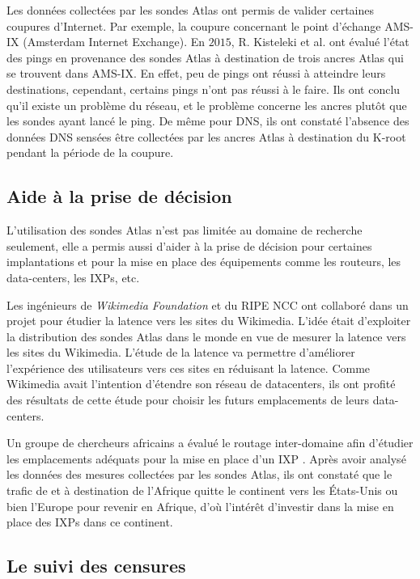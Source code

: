 Les données collectées par les sondes Atlas ont permis de valider certaines coupures d'Internet. Par exemple, la coupure concernant le point d'échange AMS-IX (Amsterdam Internet Exchange). En $2015$, R. Kisteleki  et al. \cite{Robert-Kisteleki}  ont évalué l'état des pings en provenance des sondes Atlas à destination de trois ancres Atlas qui se trouvent dans AMS-IX. En effet, peu de pings ont réussi à atteindre leurs destinations, cependant, certains pings n'ont pas réussi à le faire. Ils ont conclu qu'il existe un problème du réseau, et le problème concerne  les ancres plutôt que les sondes ayant lancé le ping. De même pour DNS, ils ont constaté l'absence des données DNS sensées être collectées par les ancres Atlas à destination du K-root pendant la période de la coupure.



\subsection{Aide à la prise de décision}
L'utilisation des sondes Atlas n'est pas limitée au domaine de recherche seulement, elle a permis aussi d'aider à la prise de décision pour certaines implantations et pour la mise en place des équipements comme les routeurs, les data-centers, les IXPs, etc. 

Les ingénieurs de \textit{Wikimedia Foundation} et du RIPE NCC ont collaboré dans un projet \cite{Wikipedia} pour étudier la  latence vers les sites  du Wikimedia. L'idée était d'exploiter la distribution des sondes  Atlas dans le monde en vue  de mesurer la latence vers les sites du Wikimedia. L'étude de la latence va permettre d'améliorer l'expérience des utilisateurs vers ces sites  en réduisant la latence. Comme Wikimedia avait l'intention d'étendre son réseau de datacenters, ils ont profité des résultats de cette étude pour choisir les futurs emplacements de leurs data-centers.


Un groupe de chercheurs africains a évalué le routage inter-domaine afin d'étudier les emplacements adéquats pour la mise en place d'un IXP \cite{FANOU-Roderick}. Après avoir analysé les données des mesures collectées par les sondes Atlas, ils ont constaté que le trafic de et à destination de l'Afrique quitte le continent vers les États-Unis ou bien  l'Europe pour revenir en Afrique, d'où l'intérêt d'investir dans la mise en place des IXPs dans ce continent.  \par


\subsection{Le suivi des censures}

